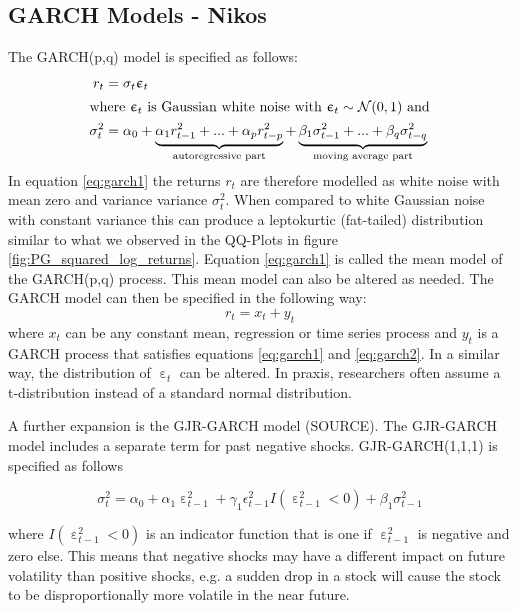\subsection{GARCH Models - Nikos}
The GARCH(p,q) model is specified as follows:
\begin{align}
    r_{t} &= \sigma_t  \upepsilon_t \label{eq:garch1}\\
\intertext{where $\upepsilon_t$ is Gaussian white noise with  $\upepsilon_t \sim \mathcal{N}(0,1)$ and}
    \sigma^2_t &= \alpha_0 + \underbrace{\alpha_1 r^2_{t-1} + ... + \alpha_p r^2_{t-p}}_\text{autoregressive part} + \underbrace{\beta_1 \sigma^2_{t-1} + ... + \beta_q \sigma^2_{t-q}}_\text{moving average part} \label{eq:garch2}
\end{align}{}
In equation \ref{eq:garch1} the returns $r_t$ are therefore modelled as white noise with mean zero and variance variance $\sigma^2_t$. When compared to white Gaussian noise with constant variance this can produce a leptokurtic (fat-tailed) distribution similar to what we observed in the QQ-Plots in figure \ref{fig:PG_squared_log_returns}. Equation \ref{eq:garch1} is called the mean model of the GARCH(p,q) process. This mean model can also be altered as needed. The GARCH model can then be specified in the following way: 
\begin{equation}
    r_t = x_t + y_t
\end{equation}{}
where $x_t$ can be any constant mean, regression or time series process and $y_t$ is a GARCH process that satisfies equations \ref{eq:garch1} and \ref{eq:garch2}. In a similar way, the distribution of $\upepsilon_t$ can be altered. In praxis, researchers often assume a t-distribution instead of a standard normal distribution. 

A further expansion is the GJR-GARCH model (SOURCE). The GJR-GARCH model includes a separate term for past negative shocks. GJR-GARCH(1,1,1) is specified as follows

\begin{equation}
    \sigma^2_t = \alpha_0 + \alpha_1 \upepsilon^2_{t-1} + \gamma_1 \epsilon^2_{t-1} I(\upepsilon^2_{t-1} < 0) + \beta_1 \sigma^2_{t-1} \label{eg:garch3}
\end{equation}{}

where $I(\upepsilon^2_{t-1} < 0)$ is an indicator function that is one if $\upepsilon^2_{t-1}$ is negative and zero else. This means that negative shocks may have a different impact on future volatility than positive shocks, e.g. a sudden drop in a stock will cause the stock to be disproportionally more volatile in the near future. 

